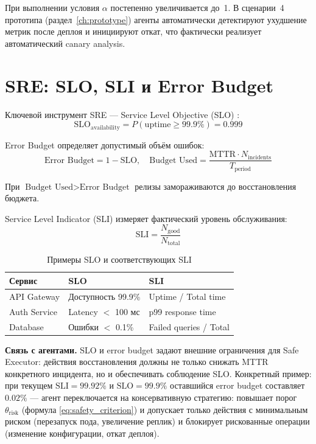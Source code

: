 При выполнении условия $\alpha$ постепенно увеличивается до~1. В сценарии~4 прототипа (раздел~\ref{ch:prototype}) агенты автоматически детектируют ухудшение метрик после деплоя и инициируют откат, что фактически реализует автоматический canary analysis.

\section{SRE: SLO, SLI и Error Budget}

Ключевой инструмент SRE --- Service Level Objective (SLO) \cite{google_sre_book}:
\begin{equation}
\text{SLO}_{\text{availability}} = P(\text{uptime} \geq 99.9\%) = 0.999
\label{eq:slo}
\end{equation}

Error Budget определяет допустимый объём ошибок:
\begin{equation}
\text{Error Budget} = 1 - \text{SLO}, \quad \text{Budget Used} = \frac{\text{MTTR} \cdot N_{\text{incidents}}}{T_{\text{period}}}
\label{eq:error_budget}
\end{equation}

При $\text{Budget Used} > \text{Error Budget}$ релизы замораживаются до восстановления бюджета.

Service Level Indicator (SLI) измеряет фактический уровень обслуживания:
\begin{equation}
\text{SLI} = \frac{N_{\text{good}}}{N_{\text{total}}}
\label{eq:sli}
\end{equation}

\begin{table}[H]
\centering
\small

\caption{Примеры SLO и соответствующих SLI}
\label{tab:slo_sli_examples}
\begin{tabular}{|>{\raggedright\arraybackslash}p{2.5cm}|>{\raggedright\arraybackslash}p{3.5cm}|>{\raggedright\arraybackslash}p{4cm}|}
\hline
Сервис & SLO & SLI \\
\hline
API Gateway & Доступность 99.9\% & Uptime / Total time \\
\hline
Auth Service & Latency $<$ 100 мс & p99 response time \\
\hline
Database & Ошибки $<$ 0.1\% & Failed queries / Total \\
\hline
\end{tabular}
\end{table}

\textbf{Связь с агентами.} SLO и error budget задают внешние ограничения для Safe Executor: действия восстановления должны не только снижать MTTR конкретного инцидента, но и обеспечивать соблюдение SLO. Конкретный пример: при текущем $\text{SLI} = 99.92\%$ и $\text{SLO} = 99.9\%$ оставшийся error budget составляет $0.02\%$ --- агент переключается на консервативную стратегию: повышает порог $\theta_{\text{risk}}$ (формула \ref{eq:safety_criterion}) и допускает только действия с минимальным риском (перезапуск пода, увеличение реплик) и блокирует рискованные операции (изменение конфигурации, откат деплоя).

